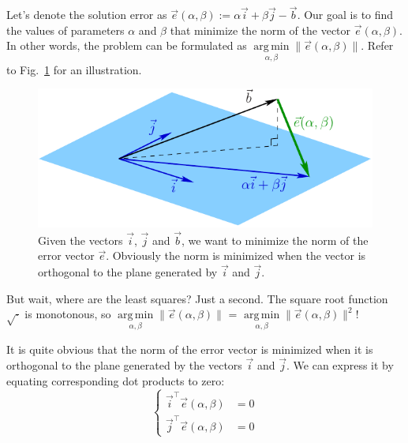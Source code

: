 \documentclass[notitlepage]{report}
\DeclareMathOperator*{\argmin}{arg\,min}
\begin{document}
Let's denote the solution error as $\vec{e}(\alpha, \beta) :=  \alpha \vec{i} + \beta\vec{j} - \vec b$.
Our goal is to find the values of parameters $\alpha$ and $\beta$ that minimize the norm of the vector $\vec{e}(\alpha, \beta)$. 
In other words, the problem can be formulated as $\argmin\limits_{\alpha, \beta} \|\vec{e}(\alpha, \beta)\|$.
Refer to Fig.~\ref{fig:error} for an illustration.

\begin{figure}[ht]
	\centering
	\includegraphics[width=.7\linewidth]{error.pdf}
	\caption{Given the vectors $\vec i$, $\vec j$ and $\vec b$, we want to minimize the norm of the error vector $\vec e$. 
    Obviously the norm is minimized when the vector is orthogonal to the plane generated by $\vec i$ and $\vec j$.}
	\label{fig:error}
\end{figure}

But wait, where are the least squares? Just a second. The square root function $\sqrt{\cdot}$ is monotonous, so $\argmin\limits_{\alpha, \beta} \|\vec{e}(\alpha, \beta)\|$ = $\argmin\limits_{\alpha, \beta} \|\vec{e}(\alpha, \beta)\|^2$!

It is quite obvious that the norm of the error vector is minimized when it is orthogonal to the plane generated by the vectors $\vec i$ and $\vec j$.
We can express it by equating corresponding dot products to zero:
$$
\left\{
\begin{split}\vec{i}^\top \vec{e}(\alpha, \beta) &= 0\\
\vec{j}^\top \vec{e}(\alpha, \beta) &= 0
\end{split}
\right.
$$
\end{document}
